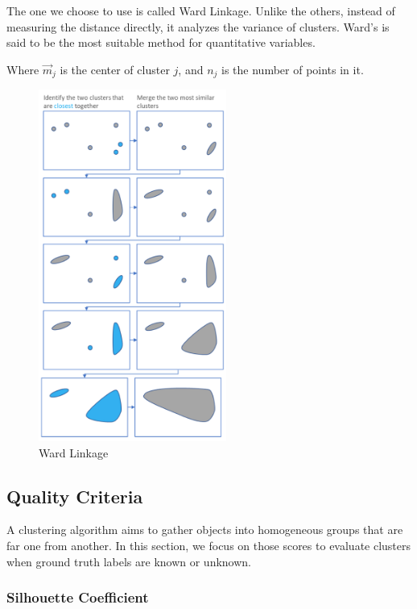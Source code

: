 \documentclass[a4paper, 12pt]{article}
\begin{document}
The one we choose to use is called Ward Linkage. Unlike the others, instead of measuring the distance directly, it analyzes the variance of clusters. Ward’s is said to be the most suitable method for quantitative variables.

Where $\vec{m}_j$ is the center of cluster $j$, and $n_j$ is the number of points in it.

\begin{figure}[ht]
    \centering
    \includegraphics[width=0.55\textwidth]{Ward Linkage.png}
    \caption{Ward Linkage \citep{hierarchicaltutorial2017}}
\end{figure}

\subsection{Quality Criteria}

A clustering algorithm aims to gather objects into homogeneous groups that are far one from another. In this section, we focus on those scores to evaluate clusters when ground truth labels are known or unknown.

\subsubsection{Silhouette Coefficient}
\end{document}

